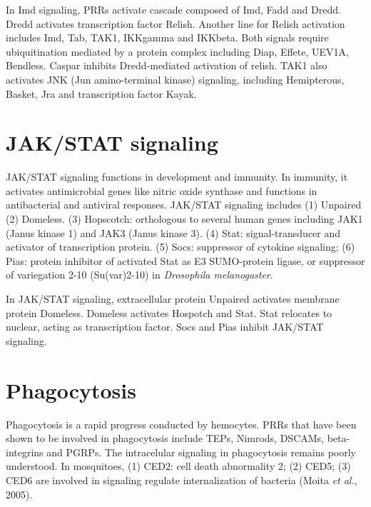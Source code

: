 \documentclass[11pt]{article}
\begin{document}
\begin{sloppypar}
\par

In Imd signaling, PRRs activate cascade composed of Imd, Fadd and Dredd. 
Dredd activates transcription factor Relish. 
Another line for Relish activation includes Imd, Tab, TAK1, IKKgamma and IKKbeta. 
Both signals require ubiquitination mediated by a protein complex including Diap, Effete, UEV1A, Bendless. 
Caspar inhibits Dredd-mediated activation of relish. 
TAK1 also activates JNK (Jun amino-terminal kinase) signaling, including Hemipterous, Basket, Jra and transcription factor Kayak. 

\section{JAK/STAT signaling}
JAK/STAT signaling functions in development and immunity. 
In immunity, it activates antimicrobial genes like nitric oxide synthase and functions in antibacterial and antiviral responses. 
JAK/STAT signaling includes 
\newline
(1) Unpaired \newline
(2) Domeless. \newline
(3) Hopscotch: orthologous to several human genes including JAK1 (Janus kinase 1) and JAK3 (Janus kinase 3). \newline
(4) Stat: signal-transducer and activator of transcription protein. \newline
(5) Socs: suppressor of cytokine signaling; \newline
(6) Pias: protein inhibitor of activated Stat as E3 SUMO-protein ligase, or suppressor of variegation 2-10 (Su(var)2-10) in \textit{Drosophila melanogaster}. 

\par

In JAK/STAT signaling, extracellular protein Unpaired activates membrane protein Domeless. 
Domeless activates Hospotch and Stat. 
Stat relocates to nuclear, acting as transcription factor. 
Socs and Pias inhibit JAK/STAT signaling. 

\section*{Phagocytosis}
Phagocytosis is a rapid progress conducted by hemocytes. 
PRRs that have been shown to be involved in phagocytosis include TEPs, Nimrods, DSCAMs, beta-integrins and PGRPs. 
The intracelular signaling in phagocytosis remains poorly understood. 
In mosquitoes, 
\newline
(1) CED2: cell death abnormality 2; \newline
(2) CED5; \newline
(3) CED6 \newline 
are involved in signaling regulate internalization of bacteria (Moita \textit{et al.}, 2005). 


\end{sloppypar}
\end{document}
